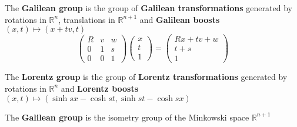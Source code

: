 \documentclass[main]{subfiles}
\begin{document}
\begin{definition}
The \textbf{Galilean group} is the group of \textbf{Galilean transformations} generated by rotations in $\mathbb R^n$, translations in $\mathbb R^{n+1}$ and \textbf{Galilean boosts} $(x,t)\mapsto (x+tv,t)$
\[\begin{pmatrix}
R&v&w \\
0&1&s \\
0&0&1
\end{pmatrix}\begin{pmatrix}
x \\
t \\
1
\end{pmatrix}=\begin{pmatrix}
Rx+tv+w \\
t+s \\
1
\end{pmatrix}\]
\end{definition}

\begin{definition}
The \textbf{Lorentz group} is the group of \textbf{Lorentz transformations} generated by rotations in $\mathbb R^n$ and \textbf{Lorentz boosts} $(x,t)\mapsto\left(\sinh s x-\cosh st,\sinh s t-\cosh sx\right)$
\end{definition}

\begin{definition}
The \textbf{Galilean group} is the isometry group of the Minkowski space $\mathbb R^{n+1}$
\end{definition}
\end{document}
